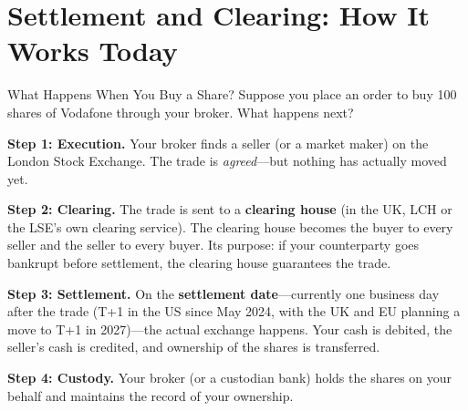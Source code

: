 \documentclass[10pt]{beamer}
\newcommand{\highlight}[1]{\textcolor{AccentOrange}{\textbf{#1}}}
\begin{document}
\section{Settlement and Clearing: How It Works Today}

\begin{frame}{What Happens When You Buy a Share?}
  Suppose you place an order to buy 100 shares of Vodafone through your broker. What happens next?
  
  \vspace{0.5em}
  \textbf{Step 1: Execution.} Your broker finds a seller (or a market maker) on the London Stock Exchange. The trade is \textit{agreed}---but nothing has actually moved yet.
  
  \vspace{0.5em}
  \textbf{Step 2: Clearing.} The trade is sent to a \highlight{clearing house} (in the UK, LCH or the LSE's own clearing service). The clearing house becomes the buyer to every seller and the seller to every buyer. Its purpose: if your counterparty goes bankrupt before settlement, the clearing house guarantees the trade.
  
  \vspace{0.5em}
  \textbf{Step 3: Settlement.} On the \highlight{settlement date}---currently one business day after the trade (T+1 in the US since May 2024, with the UK and EU planning a move to T+1 in 2027)---the actual exchange happens. Your cash is debited, the seller's cash is credited, and ownership of the shares is transferred.
  
  \vspace{0.5em}
  \textbf{Step 4: Custody.} Your broker (or a custodian bank) holds the shares on your behalf and maintains the record of your ownership.
\end{frame}
\end{document}
